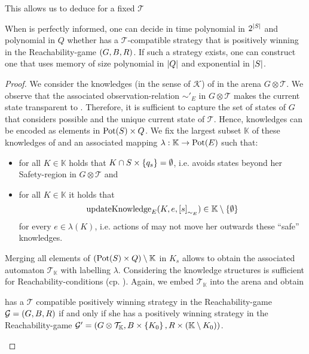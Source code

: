 This allows us to deduce for a fixed $\mathcal{T}$
\begin{theorem}
  When \adam{} is perfectly informed, one can decide in time polynomial in 
  $2^{\left\vert{S}\right\vert}$ and polynomial in $Q$ whether \eve{} has a 
  $\mathcal{T}$-compatible strategy that is positively winning in the 
  Reachability-game $\left(G, B, R\right)$. If such a strategy exists, one can 
  construct one that uses memory of size polynomial in $\left\vert{Q}\right\vert$ and 
  exponential in $\left\vert{S}\right\vert$.
  \label{thm:PerfInfAdamStrat}
\end{theorem}
\begin{proof}
  We consider the knowledges (in the sense of $\mathcal{K}$) of \eve{} in the
  arena $G\otimes\mathcal{T}$. We observe that the associated 
  observation-relation $\sim'_{E}$ in $G\otimes\mathcal{T}$ makes the current
  state transparent to \eve{}. Therefore, it is sufficient to capture the set
  of states of $G$ that \eve{} considers possible and the unique current state
  of $\mathcal{T}$. Hence, knowledges can be encoded as elements in 
  $\operatorname{Pot}(S)\times Q$. We fix the largest subset $\mathbb{K}$ of these knowledges 
  of \eve{} and an associated mapping $\lambda:\mathbb{K}\rightarrow\operatorname{Pot}(E)$ 
  such that:
  \begin{itemize}
    \item for all $K\in\mathbb{K}$ holds that $K\cap S\times\left\{q_{s}\right\} = 
      \emptyset$, i.e. \eve{} avoids states beyond her Safety-region in 
      $G\otimes\mathcal{T}$ and
    \item for all $K\in\mathbb{K}$ it holds that
      \begin{equation*}
        \operatorname{updateKnowledge}_{E}(K, e, \left[s\right]_{\sim_{E}})\in
          \mathbb{K}\setminus\left\{\emptyset\right\}
      \end{equation*}
      for every $e\in\lambda(K)$, i.e. actions of \eve{} may not move her 
      outwards these \enquote{safe} knowledges.
  \end{itemize}
  Merging all elements of $\left(\operatorname{Pot}(S)\times Q\right)\setminus\mathbb{K}$ in 
  $K_{s}$ allows to obtain the associated automaton $\mathcal{T}_{\mathbb{K}}$
  with labelling $\lambda$. Considering the knowledge structures is sufficient
  for Reachability-conditions (cp. \cite{AlgorithmsForPOSG}). Again, we embed 
  $\mathcal{T}_{\mathbb{K}}$ into the arena and obtain
  \begin{lemma}
    \eve{} has a $\mathcal{T}$ compatible positively winning strategy in the
    Reachability-game $\mathcal{G} = \left(G, B, R\right)$ if and only if she has a
    positively winning strategy in the Reachability-game $\mathcal{G'} = 
    \left(G\otimes\mathcal{T}_{\mathbb{K}}, B\times\left\{K_{0}\right\}, R\times 
    \left(\mathbb{K}\setminus K_{0}\right)\right)$. 


\end{lemma}
\end{proof}
